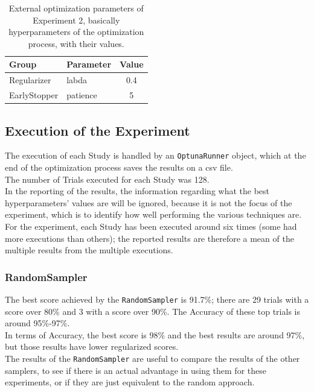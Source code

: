 \begin{table}[ht!]
	\center
	\setlength{\tabcolsep}{0.5cm}
	\caption[Optimization External Parameters of Experiment 2]{External optimization parameters of Experiment 2, basically hyperparameters of the optimization process, with their values.}
	\begin{tabular}{@{}llc@{}}
		\toprule
		\textbf{Group} & \textbf{Parameter} & \textbf{Value} \\ \midrule
		Regularizer    & labda              & 0.4            \\[0.1cm]
		EarlyStopper   & patience           & 5              \\ \bottomrule
	\end{tabular}
	\label{tab:table-4.2.2}
\end{table}

\subsection{Execution of the Experiment}

The execution of each Study is handled by an \texttt{OptunaRunner} object, which at the end of the optimization process saves the results on a csv file.
\\[0.3cm]The number of Trials executed for each Study was 128.
\\[0.3cm]In the reporting of the results, the information regarding what the best hyperparameters' values are will be ignored, because it is not the focus of the experiment, which is to identify how well performing the various techniques are.
\\[0.3cm]For the experiment, each Study has been executed around six times (some had more executions than others); the reported results are therefore a mean of the multiple results from the multiple executions. 

\subsubsection{RandomSampler}

The best score achieved by the \texttt{RandomSampler} is 91.7\%; there are 29 trials with a score over 80\% and 3 with a score over 90\%. The Accuracy of these top trials is around 95\%-97\%.
\\[0.3cm]In terms of Accuracy, the best score is 98\% and the best results are around 97\%, but those results have lower regularized scores.
\\[0.3cm]The results of the \texttt{RandomSampler} are useful to compare the results of the other samplers, to see if there is an actual advantage in using them for these experiments, or if they are just equivalent to the random approach.

